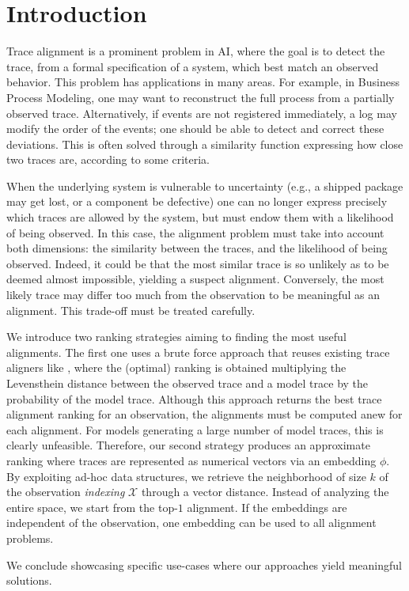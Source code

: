 
\section{Introduction}
\label{introduction}

Trace alignment is a prominent problem in AI, where the goal is to detect the trace, from a formal specification of a system,
which best match an observed behavior. This problem has applications in many areas. For example, in Business Process Modeling,
one may want to reconstruct the full process from a partially observed trace. Alternatively, if events are not registered immediately,
a log may modify the order of the events; one should be able to detect and correct these deviations. This is often solved
through a similarity function expressing how close two traces are, according to some criteria.

When the underlying system is vulnerable to uncertainty (e.g., a shipped package may get lost, or a component be defective)
one can no longer express precisely which traces are allowed by the system, but must endow them with a likelihood
of being observed. In this case, the alignment problem must take into account both dimensions: the similarity between the
traces, and the likelihood of being observed. Indeed, it could be that the most similar trace is so unlikely as to be deemed almost
impossible, yielding a suspect alignment. Conversely, the most likely trace may differ too much from the observation to be
meaningful as an alignment. This trade-off must be treated carefully.

We introduce two ranking strategies aiming to finding the most useful alignments. The first one uses a brute force approach that
reuses existing trace aligners like \cite{DBLP:conf/edoc/AdriansyahDA11,LeoniM17}, where the (optimal) ranking
is obtained multiplying the Levensthein distance between the observed trace and a model trace by the probability of the
model trace. Although this approach returns the best trace alignment ranking for an observation, the alignments must be computed
anew for each alignment. For models generating a large number of model traces, this is clearly unfeasible. Therefore, our second
strategy produces an approximate ranking where traces are represented as numerical vectors via an embedding $\phi$.
By exploiting ad-hoc data structures, we retrieve the neighborhood of size $k$ of the observation \textit{indexing} $\mathcal{X}$
through a vector distance. Instead of analyzing the entire space, we start from the top-$1$ alignment. If the embeddings are
independent of the observation, one embedding can be used to all alignment problems.

We conclude showcasing specific use-cases where our approaches yield meaningful solutions. 